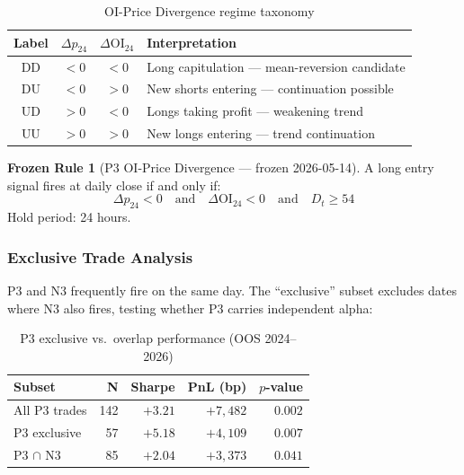 \documentclass[12pt, a4paper]{article}
\theoremstyle{definition}
\newtheorem{rule_}{Frozen Rule}[section]
\begin{document}
\begin{table}[H]
\centering
\caption{OI-Price Divergence regime taxonomy}
\begin{tabular}{cccl}
\toprule
\textbf{Label} & $\Delta p_{24}$ & $\Delta \text{OI}_{24}$ & \textbf{Interpretation} \\
\midrule
DD & $< 0$ & $< 0$ & Long capitulation — mean-reversion candidate \\
DU & $< 0$ & $> 0$ & New shorts entering — continuation possible \\
UD & $> 0$ & $< 0$ & Longs taking profit — weakening trend \\
UU & $> 0$ & $> 0$ & New longs entering — trend continuation \\
\bottomrule
\end{tabular}
\end{table}

\begin{rule_}[P3 OI-Price Divergence — frozen 2026-05-14]
\label{rule:p3}
A long entry signal fires at daily close if and only if:
\begin{equation}
    \Delta p_{24} < 0 \quad \text{and} \quad \Delta \text{OI}_{24} < 0
    \quad \text{and} \quad D_t \geq 54
    \label{eq:p3_rule}
\end{equation}
Hold period: 24 hours.
\end{rule_}

\subsubsection{Exclusive Trade Analysis}

P3 and N3 frequently fire on the same day. The ``exclusive'' subset
excludes dates where N3 also fires, testing whether P3 carries independent
alpha:

\begin{table}[H]
\centering
\caption{P3 exclusive vs.\ overlap performance (OOS 2024–2026)}
\begin{tabular}{lrrrr}
\toprule
\textbf{Subset} & \textbf{N} & \textbf{Sharpe} & \textbf{PnL (bp)} & \textbf{$p$-value} \\
\midrule
All P3 trades    & 142 & $+3.21$ & $+7{,}482$ & $0.002$ \\
P3 exclusive     & 57  & $+5.18$ & $+4{,}109$ & $0.007$ \\
P3 $\cap$ N3     & 85  & $+2.04$ & $+3{,}373$ & $0.041$ \\
\bottomrule
\end{tabular}
\end{table}
\end{document}
